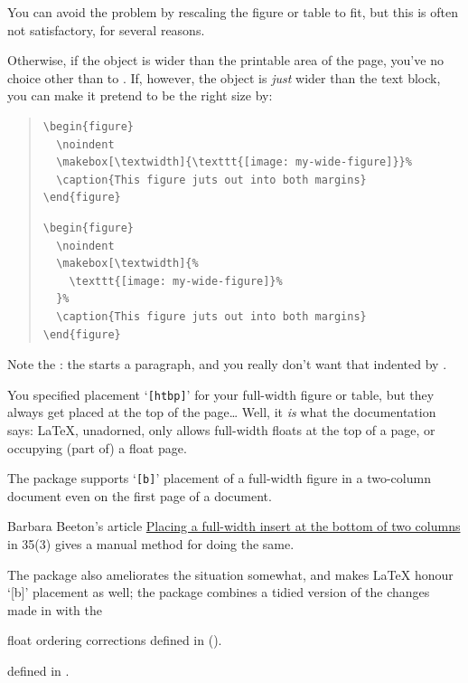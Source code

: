 You can avoid the problem by rescaling the figure or table to fit, but
this is often not satisfactory, for several reasons.

Otherwise, if the object is wider than the printable area of the page,
you've no choice other than to .  If,
however, the object is \emph{just} wider than the text block, you can
make it pretend to be the right size by:
\begin{quote}
\begin{wideversion}
\begin{verbatim}
\begin{figure}
  \noindent
  \makebox[\textwidth]{\texttt{[image: my-wide-figure]}}%
  \caption{This figure juts out into both margins}
\end{figure}
\end{verbatim}
\end{wideversion}
\begin{narrowversion}
\begin{verbatim}
\begin{figure}
  \noindent
  \makebox[\textwidth]{%
    \texttt{[image: my-wide-figure]}%
  }%
  \caption{This figure juts out into both margins}
\end{figure}
\end{verbatim}
\end{narrowversion}
\end{quote}
Note the : the  starts a paragraph, and you
really don't want that indented by .


You specified placement `\texttt{[htbp]}' for your full-width figure or
table, but they always get placed at the top of the page\dots{}  Well,
it \emph{is} what the documentation says: \LaTeX{}, unadorned, only
allows full-width floats at the top of a page, or occupying (part of) a
float page.

The package  supports `\texttt{[b]}' placement of a
full-width figure in a two-column document even on the first page of a
document.

Barbara Beeton's article
\href{http://tug.org/TUGboat/tb35-3/tb111beet-banner.pdf}{Placing a full-width insert at the bottom of two columns} in \TUGboat{} 35(3)
gives a manual method for doing the same.

The  package also ameliorates the situation somewhat, and
makes \LaTeX{} honour `[b]' placement as well; the
 package combines a tidied version of the changes
made in  with the
\begin{narrowversion} %
  float ordering corrections defined in 
  ().
\end{narrowversion}
\begin{wideversion} %
   defined in
  .
\end{wideversion}

